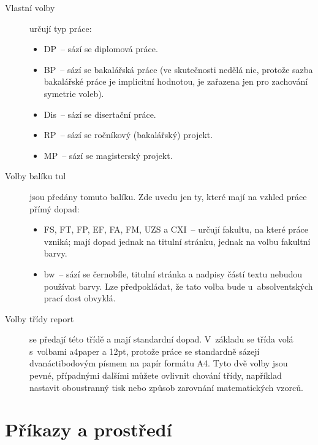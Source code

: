 \documentclass[FM,DP]{tulthesis}
\newcommand{\argument}[1]{{\ttfamily\color{\tulcolor}#1}}
\begin{document}
\begin{description}
\item[Vlastní volby] určují typ práce:

\begin{itemize}
\item \argument{DP}~-- sází se diplomová práce.
\item \argument{BP}~-- sází se bakalářská práce (ve skutečnosti nedělá nic,
protože sazba bakalářské práce je implicitní hodnotou, je zařazena jen pro
zachování symetrie voleb).
\item \argument{Dis}~-- sází se disertační práce.
\item \argument{RP}~-- sází se ročníkový (bakalářský) projekt.
\item \argument{MP}~-- sází se magisterský projekt.
\end{itemize}

\item[Volby balíku \argument{tul}] jsou předány tomuto balíku. Zde uvedu jen
ty, které mají na vzhled práce přímý dopad:

\begin{itemize}
\item \argument{FS},
\argument{FT},
\argument{FP},
\argument{EF},
\argument{FA},
\argument{FM},
\argument{UZS} a
\argument{CXI}~-- určují fakultu, na které práce vzniká; mají dopad jednak na
titulní stránku, jednak na volbu fakultní barvy.

\item \argument{bw}~-- sází se černobíle, titulní stránka a nadpisy částí textu
nebudou používat barvy. Lze předpokládat, že tato volba bude u~absolventských
prací dost obvyklá.
\end{itemize}

\item[Volby třídy \argument{report}] se předají této třídě a mají
standardní dopad. V~základu se třída volá s~volbami \argument{a4paper} a
\argument{12pt}, protože práce se standardně sázejí dvanáctibodovým písmem na
papír formátu A4. Tyto dvě volby jsou pevné, případnými dalšími můžete ovlivnit
chování třídy, například nastavit oboustranný tisk nebo způsob zarovnání
matematických vzorců.

\end{description}


\chapter{Příkazy a prostředí}
\end{document}

